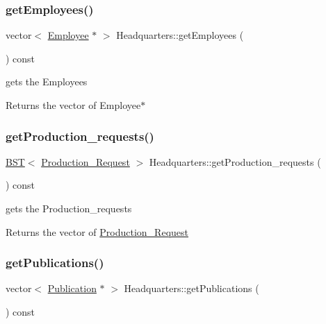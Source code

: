 \subsubsection{\texorpdfstring{get\+Employees()}{getEmployees()}}
{\footnotesize\ttfamily vector$<$ \hyperlink{class_employee}{Employee} $\ast$ $>$ Headquarters\+::get\+Employees (\begin{DoxyParamCaption}{ }\end{DoxyParamCaption}) const}



gets the Employees 

\begin{DoxyReturn}{Returns}
the vector of Employee$\ast$ 
\end{DoxyReturn}
\mbox{\label{class_headquarters_a27b1b95a72714a75ad464f60d0b86b38}} 
\subsubsection{\texorpdfstring{get\+Production\+\_\+requests()}{getProduction\_requests()}}
{\footnotesize\ttfamily \hyperlink{class_b_s_t}{B\+ST}$<$ \hyperlink{class_production___request}{Production\+\_\+\+Request} $>$ Headquarters\+::get\+Production\+\_\+requests (\begin{DoxyParamCaption}{ }\end{DoxyParamCaption}) const}



gets the Production\+\_\+requests 

\begin{DoxyReturn}{Returns}
the vector of \hyperlink{class_production___request}{Production\+\_\+\+Request} 
\end{DoxyReturn}
\mbox{\label{class_headquarters_a71a68cac0db5c9aa33b548f4b696b9bc}} 
\subsubsection{\texorpdfstring{get\+Publications()}{getPublications()}}
{\footnotesize\ttfamily vector$<$ \hyperlink{class_publication}{Publication} $\ast$ $>$ Headquarters\+::get\+Publications (\begin{DoxyParamCaption}{ }\end{DoxyParamCaption}) const}



